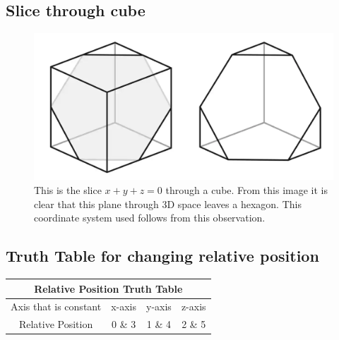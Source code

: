 \subsection{Slice through cube}
\label{fig:hexagona_slice_through_cube}
\begin{figure}[H]
    \centering
    \includegraphics[scale = 0.3]{images/hexagonal_slice_through_cube.png}
    \caption{This is the slice  $x + y + z = 0$ through a cube. From this image it is clear that this plane through 3D space leaves a hexagon. This coordinate system used follows from this observation.}

\end{figure}

\subsection{Truth Table for changing relative position}
\label{table:relative_position_truth_table}

\begin{tabular}{|c||c|c|c|}
    \hline
    \multicolumn{4}{|c|}{Relative Position Truth Table} \\
    \hline
    Axis that is constant & x-axis & y-axis & z-axis \\
    \hline
    Relative Position    & 0 \&  3 & 1 \& 4 & 2 \& 5 \\
    \hline
\end{tabular}


